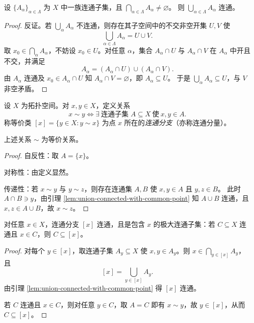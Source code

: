 \documentclass[lang=cn,a4paper,newtx,figureplace=section,tableplace=section]{elegantbook}
\begin{document}
\begin{lemma}\label{lem:union-connected-with-common-point}
  设 $\{A_\alpha\}_{\alpha\in\Lambda}$ 为 $X$ 中一族连通子集，且 $\bigcap_{\alpha\in\Lambda}A_\alpha\neq\varnothing$。
  则 $\bigcup_{\alpha\in\Lambda}A_\alpha$ 连通。
\end{lemma}
\begin{proof}
  反证。若 $\bigcup_{\alpha}A_\alpha$ 不连通，则存在其子空间中的不交非空开集 $U,V$ 使
  \[
    \bigcup_{\alpha\in\Lambda}A_\alpha=U\cup V.
  \]
  取 $x_0\in\bigcap_{\alpha}A_\alpha$，不妨设 $x_0\in U$。对任意 $\alpha$，集合 $A_\alpha\cap U$ 与 $A_\alpha\cap V$ 在 $A_\alpha$ 中开且不交，并满足
  \[
    A_\alpha=(A_\alpha\cap U)\cup(A_\alpha\cap V).
  \]
  由 $A_\alpha$ 连通及 $x_0\in A_\alpha\cap U$ 知 $A_\alpha\cap V=\varnothing$，即 $A_\alpha\subseteq U$。
  于是 $\bigcup_{\alpha}A_\alpha\subseteq U$，与 $V$ 非空矛盾。
\end{proof}

\begin{definition}[连通分支]\label{def:connected-component}
  设 $X$ 为拓扑空间。对 $x,y\in X$，定义关系
  \[
    x\sim y\iff \exists\ \text{连通子集 }A\subseteq X\ \text{使}\ x,y\in A.
  \]
  称等价类 $[x]=\{y\in X:y\sim x\}$ 为点 $x$ 所在的\emph{连通分支}（亦称连通分量）。
\end{definition}

\begin{proposition}\label{prop:connected-component-eqrel}
  上述关系 $\sim$ 为等价关系。
\end{proposition}
\begin{proof}
  自反性：取 $A=\{x\}$。

  对称性：由定义显然。

  传递性：若 $x\sim y$ 与 $y\sim z$，则存在连通集 $A,B$ 使 $x,y\in A$ 且 $y,z\in B$。
  此时 $A\cap B\ni y$，由引理 \ref{lem:union-connected-with-common-point} 知 $A\cup B$ 连通，且 $x,z\in A\cup B$，故 $x\sim z$。
\end{proof}

\begin{proposition}\label{prop:connected-component-maximal}
  对任意 $x\in X$，连通分支 $[x]$ 连通，且是包含 $x$ 的极大连通子集：若 $C\subseteq X$ 连通且 $x\in C$，则 $C\subseteq[x]$。
\end{proposition}
\begin{proof}
  对每个 $y\in[x]$，取连通子集 $A_y\subseteq X$ 使 $x,y\in A_y$。则 $x\in\bigcap_{y\in[x]}A_y$，且
  \[
    [x]=\bigcup_{y\in[x]}A_y.
  \]
  由引理 \ref{lem:union-connected-with-common-point} 得 $[x]$ 连通。

  若 $C$ 连通且 $x\in C$，则对任意 $y\in C$，取 $A=C$ 即有 $x\sim y$，故 $y\in[x]$，从而 $C\subseteq[x]$。
\end{proof}
\end{document}

